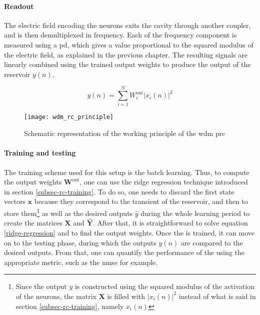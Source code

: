 \paragraph{Readout}

The electric field encoding the neurons exits the cavity through another coupler, and is then demultiplexed in frequency. Each of the frequency component is measured using a \gls{pd}, which gives a value proportional to the squared modulus of the electric field, as explained in the previous chapter. The resulting signals are linearly combined using the trained output weights to produce the output of the reservoir $y(n)$.

\begin{equation}
	y(n) = \sum_{i=1}^{N} W_i^{\text{out}} |x_i(n)|^2
\end{equation}

\begin{figure}[h]
	\centering
	\texttt{[image: wdm\_rc\_principle]}
	\caption{Schematic representation of the working principle of the \gls{wdm} \gls{prc} \cite{AkroutAkram2016Pprc}}
	\label{wdm_rc_principle}
\end{figure}

\paragraph{Training and testing}

The training scheme used for this setup is the batch learning. Thus, to compute the output weights $\mathbf{W}^{\text{out}}$, one can use the ridge regression technique introduced in section \ref{subsec-rc-training}. To do so, one needs to discard the first state vectors $\mathbf{x}$ because they correspond to the transient of the reservoir, and then to store them\footnote{Since the output $y$ is constructed using the squared modulus of the activation of the neurons, the matrix $\mathbf{X}$ is filled with $|x_i(n)|^2$ instead of what is said in section \ref{subsec-rc-training}, namely $x_i(n)$} as well as the desired outputs $\hat{y}$ during the whole learning period to create the matrices $\mathbf{X}$ and $\hat{\mathbf{Y}}$. After that, it is straightforward to solve equation \eqref{ridge-regression} and to find the output weights. Once the \rcer is trained, it can move on to the testing phase, during which the outputs $y(n)$ are compared to the desired outputs. From that, one can quantify the performance of the \rcer using the appropriate metric, such as the \gls{nmse} for example.

